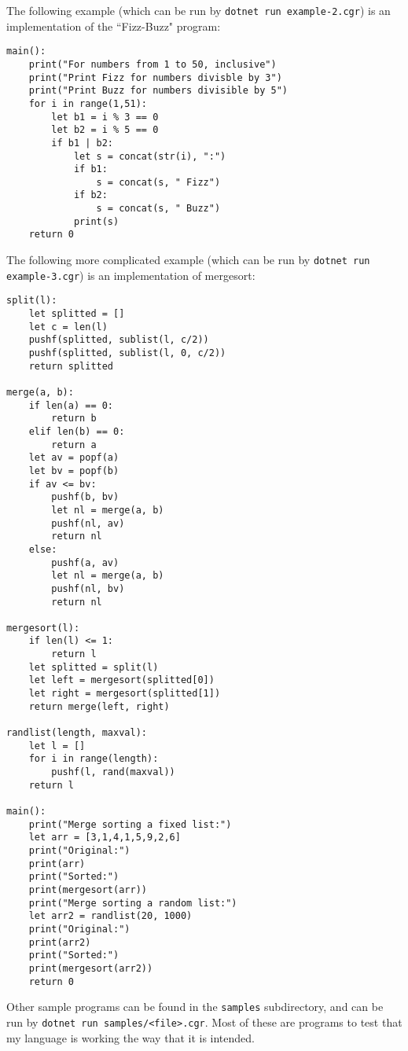 \documentclass{article}
\begin{document}
The following example (which can be run by \texttt{dotnet run example-2.cgr}) is an implementation of the ``Fizz-Buzz" program:
\begin{lstlisting}[style=fssnake]
main():
    print("For numbers from 1 to 50, inclusive")
    print("Print Fizz for numbers divisble by 3")
    print("Print Buzz for numbers divisible by 5")
    for i in range(1,51):
        let b1 = i % 3 == 0
        let b2 = i % 5 == 0
        if b1 | b2:
            let s = concat(str(i), ":")
            if b1:
                s = concat(s, " Fizz")
            if b2:
                s = concat(s, " Buzz")
            print(s)
    return 0
\end{lstlisting}

The following more complicated example (which can be run by \texttt{dotnet run example-3.cgr}) is an implementation of mergesort:
\begin{lstlisting}[style=fssnake]
split(l):
    let splitted = []
    let c = len(l)
    pushf(splitted, sublist(l, c/2))
    pushf(splitted, sublist(l, 0, c/2))
    return splitted

merge(a, b):
    if len(a) == 0:
        return b
    elif len(b) == 0:
        return a
    let av = popf(a)
    let bv = popf(b)
    if av <= bv:
        pushf(b, bv)
        let nl = merge(a, b)
        pushf(nl, av)
        return nl
    else:
        pushf(a, av)
        let nl = merge(a, b)
        pushf(nl, bv)
        return nl    

mergesort(l):
    if len(l) <= 1:
        return l
    let splitted = split(l)
    let left = mergesort(splitted[0])
    let right = mergesort(splitted[1])
    return merge(left, right)

randlist(length, maxval):
    let l = []
    for i in range(length):
        pushf(l, rand(maxval))
    return l

main():
    print("Merge sorting a fixed list:")
    let arr = [3,1,4,1,5,9,2,6]
    print("Original:")
    print(arr)
    print("Sorted:")
    print(mergesort(arr))
    print("Merge sorting a random list:")
    let arr2 = randlist(20, 1000)
    print("Original:")
    print(arr2)
    print("Sorted:")
    print(mergesort(arr2))
    return 0
\end{lstlisting}

Other sample programs can be found in the \texttt{samples} subdirectory, and can be run by \texttt{dotnet run samples/<file>.cgr}. Most of these are programs to test that my language is working the way that it is intended.
\end{document}
